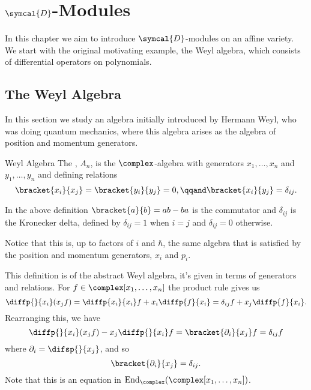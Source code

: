 \documentclass[fleqn]{NotesClass}
\newcommand{\D}{\symcal{D}}
\DeclareMathOperator{\End}{End}
\begin{document}
    \chapter{\texorpdfstring{\(\D\)}{D}-Modules}
    In this chapter we aim to introduce \(\D\)-modules on an affine variety.
    We start with the original motivating example, the Weyl algebra, which consists of differential operators on polynomials.
    
    \section{The Weyl Algebra}
    In this section we study an algebra initially introduced by Hermann Weyl, who was doing quantum mechanics, where this algebra arises as the algebra of position and momentum generators.
    
    \begin{dfn}{Weyl Algebra}{}
        The , \(A_n\), is the \(\complex\)-algebra with generators \(x_1, \dotsc, x_n\) and \(y_1, \dotsc, y_n\) and defining relations
        \begin{equation}
            \bracket{x_i}{x_j} = \bracket{y_i}{y_j} = 0, \qqand \bracket{x_i}{y_j} = \delta_{ij}.
        \end{equation}
    \end{dfn}
    
    In the above definition \(\bracket{a}{b} = ab - ba\) is the commutator and \(\delta_{ij}\) is the Kronecker delta, defined by \(\delta_{ij} = 1\) when \(i = j\) and \(\delta_{ij} = 0\) otherwise.
    
    Notice that this is, up to factors of \(i\) and \(\hbar\), the same algebra that is satisfied by the position and momentum generators, \(x_i\) and \(p_i\).
    
    This definition is of the abstract Weyl algebra, it's given in terms of generators and relations.
    For \(f \in \complex[x_1, \dotsc, x_n]\) the product rule gives us
    \begin{equation}
        \diffp{}{x_i}(x_j f) = \diffp{x_i}{x_i} f + x_i \diffp{f}{x_i} = \delta_{ij}f + x_j \diffp{f}{x_i}.
    \end{equation}
    Rearranging this, we have
    \begin{equation}
        \diffp{}{x_i}(x_j f) - x_j \diffp{}{x_i}f = \bracket{\partial_i}{x_j}f = \delta_{ij}f
    \end{equation}
    where \(\partial_i = \difsp{}{x_j}\), and so
    \begin{equation}
        \bracket{\partial_i}{x_j} = \delta_{ij}.
    \end{equation}
    Note that this is an equation in \(\End_{\complex}(\complex[x_1, \dotsc, x_n])\).
    
\end{document}
